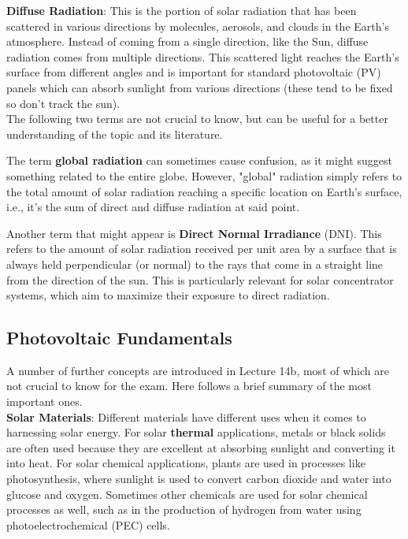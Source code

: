 \textbf{Diffuse Radiation}: This is the portion of solar radiation that has been
scattered in various directions by molecules, aerosols, and clouds in the 
Earth's atmosphere. Instead of coming from a single direction, like the Sun, 
diffuse radiation comes from multiple directions. This scattered light reaches
the Earth's surface from different angles and is important for standard 
photovoltaic (\gls{PV}) panels which can absorb sunlight from various directions (these
tend to be fixed so don't track the sun). \\

\noindent The following two terms are not crucial to know, but can be useful for a better 
understanding of the topic and its literature.

The term \textbf{global radiation} can sometimes cause confusion, as it might suggest 
something related to the entire globe. However, "global" radiation
simply refers to the total amount of solar radiation reaching a specific location
on Earth's surface, i.e., it's the sum of direct and diffuse radiation at said point.

Another term that might appear is \textbf{Direct Normal Irradiance} (DNI). 
This refers to the amount of solar radiation received per unit area by a surface 
that is always held perpendicular (or normal) to the rays that come in a straight 
line from the direction of the sun. This is particularly relevant for solar 
concentrator systems, which aim to maximize their exposure to direct radiation.

\subsection{Photovoltaic Fundamentals}
\label{sec:PV_fundamentals}

\noindent A number of further concepts are introduced in Lecture 14b, most of which
are not crucial to know for the exam. Here follows a brief summary of the most
important ones.\\

\textbf{Solar Materials}: Different materials have different uses when it comes to 
harnessing solar energy. For solar \textbf{thermal} applications, metals or black solids 
are often used because they are excellent at absorbing sunlight and converting 
it into heat. For solar chemical applications, plants are used in processes like 
photosynthesis, where sunlight is used to convert carbon dioxide and water into 
glucose and oxygen. Sometimes other chemicals are used for solar chemical
processes as well, such as in the production of hydrogen from water using
photoelectrochemical (PEC) cells. \\

